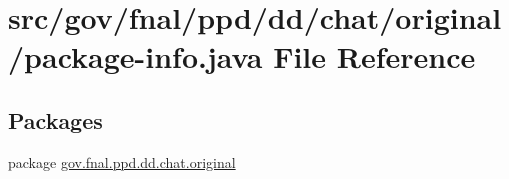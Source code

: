 \hypertarget{dd_2chat_2original_2package-info_8java}{\section{src/gov/fnal/ppd/dd/chat/original/package-\/info.java File Reference}
\label{dd_2chat_2original_2package-info_8java}
}
\subsection*{Packages}
\begin{DoxyCompactItemize}
\item 
package \hyperlink{namespacegov_1_1fnal_1_1ppd_1_1dd_1_1chat_1_1original}{gov.\-fnal.\-ppd.\-dd.\-chat.\-original}
\end{DoxyCompactItemize}
